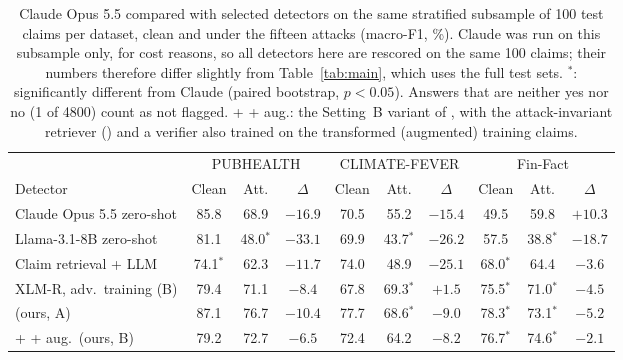 \begin{table}[t]\centering\small\setlength{\tabcolsep}{5pt}
\begin{adjustbox}{max width=\textwidth}\begin{tabular}{lccccccccc}
\toprule
 & \multicolumn{3}{c}{PUBHEALTH} & \multicolumn{3}{c}{CLIMATE-FEVER} & \multicolumn{3}{c}{Fin-Fact} \\
\cmidrule(lr){2-4} \cmidrule(lr){5-7} \cmidrule(lr){8-10}
Detector & Clean & Att. & $\Delta$ & Clean & Att. & $\Delta$ & Clean & Att. & $\Delta$ \\
\midrule
Claude Opus 5.5 zero-shot \citep{anthropic2026opus55} & 85.8 & 68.9 & $-16.9$ & 70.5 & 55.2 & $-15.4$ & 49.5 & 59.8 & $+10.3$ \\
Llama-3.1-8B zero-shot \citep{grattafiori2024llama3} & 81.1 & 48.0$^{*}$ & $-33.1$ & 69.9 & 43.7$^{*}$ & $-26.2$ & 57.5 & 38.8$^{*}$ & $-18.7$ \\
Claim retrieval + LLM \citep{pikuliak2023multiclaim} & 74.1$^{*}$ & 62.3 & $-11.7$ & 74.0 & 48.9 & $-25.1$ & 68.0$^{*}$ & 64.4 & $-3.6$ \\
XLM-R, adv.\ training \citep{conneau2020xlmr} (B) & 79.4 & 71.1 & $-8.4$ & 67.8 & 69.3$^{*}$ & $+1.5$ & 75.5$^{*}$ & 71.0$^{*}$ & $-4.5$ \\
\method{} (ours, A) & 87.1 & 76.7 & $-10.4$ & 77.7 & 68.6$^{*}$ & $-9.0$ & 78.3$^{*}$ & 73.1$^{*}$ & $-5.2$ \\
\method{} + \air{} + aug.\ (ours, B) & 79.2 & 72.7 & $-6.5$ & 72.4 & 64.2 & $-8.2$ & 76.7$^{*}$ & 74.6$^{*}$ & $-2.1$ \\
\bottomrule
\end{tabular}\end{adjustbox}
\caption{Claude Opus 5.5 compared with selected detectors on the same stratified subsample of 100 test claims per dataset, clean and under the fifteen attacks (macro-F1, \%). Claude was run on this subsample only, for cost reasons, so all detectors here are rescored on the same 100 claims; their numbers therefore differ slightly from Table~\ref{tab:main}, which uses the full test sets. $^{*}$: significantly different from Claude (paired bootstrap, $p<0.05$). Answers that are neither yes nor no (1 of 4800) count as not flagged. \method{} + \air{} + aug.: the Setting~B variant of \method{}, with the attack-invariant retriever (\air{}) and a verifier also trained on the transformed (augmented) training claims.}
\label{tab:claude}
\end{table}
